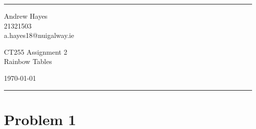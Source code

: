 \documentclass[a4paper]{article}
\begin{document}

\fancyhead[C]{}
\hrule \medskip %
\begin{minipage}{0.295\textwidth} 
\raggedright
\footnotesize
Andrew Hayes \hfill\\   
21321503 \hfill\\
a.hayes18@nuigalway.ie
\end{minipage}
\begin{minipage}{0.4\textwidth} 
\centering 
\large 
CT255 Assignment 2\\ 
\normalsize 
Rainbow Tables\\ 
\end{minipage}
\begin{minipage}{0.295\textwidth} 
\raggedleft
\today\hfill\\
\end{minipage}
\medskip\hrule 
\bigskip


\section{Problem 1}
\end{document}
